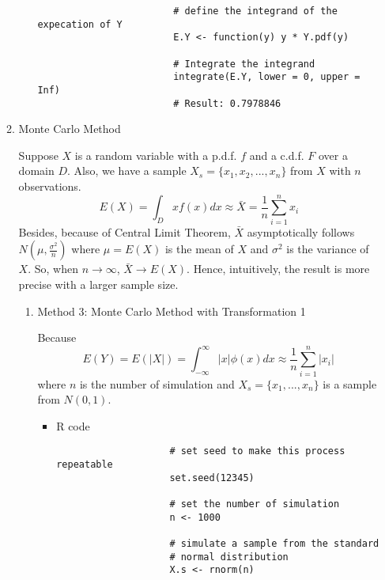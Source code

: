 \begin{enumerate}
\begin{enumerate}
\begin{itemize}
\begin{verbatim}
						# define the integrand of the expecation of Y
						E.Y <- function(y) y * Y.pdf(y)
						
						# Integrate the integrand
						integrate(E.Y, lower = 0, upper = Inf)
						# Result: 0.7978846
					\end{verbatim}
				\end{itemize}
			\item Monte Carlo Method
			\par Suppose $X$ is a random variable with a p.d.f. $f$ and a c.d.f. $F$ over a domain $D$. Also, we have a sample $X_s = \{x_1, x_2, ..., x_n\}$ from $X$ with $n$ observations.
			\begin{equation*}
			E(X) = \int_{D}xf(x)dx \approx \bar{X} = \frac{1}{n} \sum_{i = 1}^{n}x_i
			\end{equation*}
			Besides, because of Central Limit Theorem, $\bar{X}$ asymptotically follows $N(\mu, \frac{\sigma^2}{n})$ where $\mu = E(X)$ is the mean of $X$ and $\sigma^2$ is the variance of $X$. So, when $n \rightarrow \infty$, $\bar{X} \rightarrow E(X)$. Hence, intuitively, the result is more precise with a larger sample size.
			\begin{enumerate}
				\item Method 3: Monte Carlo Method with Transformation 1
				\par Because 
				\begin{equation*}
				E(Y) = E(|X|) = \int_{-\infty}^{\infty}|x| \phi(x)dx \approx \frac{1}{n}\sum_{i = 1}^{n} |x_i|
				\end{equation*}
				where $n$ is the number of simulation and $X_s = \{ x_1, ..., x_n\}$ is a sample from $N(0, 1)$.
				\begin{itemize}
					\item R code
					\begin{verbatim}
					# set seed to make this process repeatable
					set.seed(12345)
					
					# set the number of simulation
					n <- 1000
					
					# simulate a sample from the standard 
					# normal distribution
					X.s <- rnorm(n)
					

\end{verbatim}
\end{itemize}
\end{enumerate}
\end{enumerate}
\end{enumerate}

